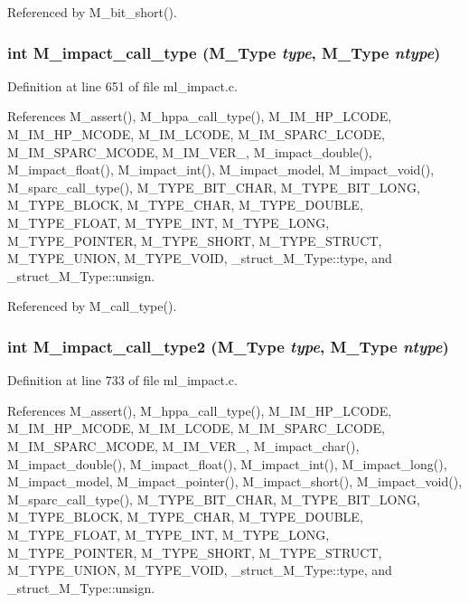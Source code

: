 Referenced by M\_\-bit\_\-short().
\subsubsection{\setlength{\rightskip}{0pt plus 5cm}int M\_\-impact\_\-call\_\-type (\bf{M\_\-Type} {\em type}, \bf{M\_\-Type} {\em ntype})}\label{ml__impact_8c_3a7eece9501df8e160fe2c727acb66c4}




Definition at line 651 of file ml\_\-impact.c.

References M\_\-assert(), M\_\-hppa\_\-call\_\-type(), M\_\-IM\_\-HP\_\-LCODE, M\_\-IM\_\-HP\_\-MCODE, M\_\-IM\_\-LCODE, M\_\-IM\_\-SPARC\_\-LCODE, M\_\-IM\_\-SPARC\_\-MCODE, M\_\-IM\_\-VER\_, M\_\-impact\_\-double(), M\_\-impact\_\-float(), M\_\-impact\_\-int(), M\_\-impact\_\-model, M\_\-impact\_\-void(), M\_\-sparc\_\-call\_\-type(), M\_\-TYPE\_\-BIT\_\-CHAR, M\_\-TYPE\_\-BIT\_\-LONG, M\_\-TYPE\_\-BLOCK, M\_\-TYPE\_\-CHAR, M\_\-TYPE\_\-DOUBLE, M\_\-TYPE\_\-FLOAT, M\_\-TYPE\_\-INT, M\_\-TYPE\_\-LONG, M\_\-TYPE\_\-POINTER, M\_\-TYPE\_\-SHORT, M\_\-TYPE\_\-STRUCT, M\_\-TYPE\_\-UNION, M\_\-TYPE\_\-VOID, \_\-struct\_\-M\_\-Type::type, and \_\-struct\_\-M\_\-Type::unsign.

Referenced by M\_\-call\_\-type().
\subsubsection{\setlength{\rightskip}{0pt plus 5cm}int M\_\-impact\_\-call\_\-type2 (\bf{M\_\-Type} {\em type}, \bf{M\_\-Type} {\em ntype})}\label{ml__impact_8c_50f1220ba58ed00fae9a86a14f7a71dc}




Definition at line 733 of file ml\_\-impact.c.

References M\_\-assert(), M\_\-hppa\_\-call\_\-type(), M\_\-IM\_\-HP\_\-LCODE, M\_\-IM\_\-HP\_\-MCODE, M\_\-IM\_\-LCODE, M\_\-IM\_\-SPARC\_\-LCODE, M\_\-IM\_\-SPARC\_\-MCODE, M\_\-IM\_\-VER\_, M\_\-impact\_\-char(), M\_\-impact\_\-double(), M\_\-impact\_\-float(), M\_\-impact\_\-int(), M\_\-impact\_\-long(), M\_\-impact\_\-model, M\_\-impact\_\-pointer(), M\_\-impact\_\-short(), M\_\-impact\_\-void(), M\_\-sparc\_\-call\_\-type(), M\_\-TYPE\_\-BIT\_\-CHAR, M\_\-TYPE\_\-BIT\_\-LONG, M\_\-TYPE\_\-BLOCK, M\_\-TYPE\_\-CHAR, M\_\-TYPE\_\-DOUBLE, M\_\-TYPE\_\-FLOAT, M\_\-TYPE\_\-INT, M\_\-TYPE\_\-LONG, M\_\-TYPE\_\-POINTER, M\_\-TYPE\_\-SHORT, M\_\-TYPE\_\-STRUCT, M\_\-TYPE\_\-UNION, M\_\-TYPE\_\-VOID, \_\-struct\_\-M\_\-Type::type, and \_\-struct\_\-M\_\-Type::unsign.

